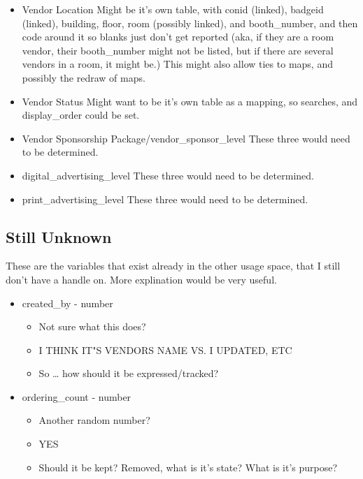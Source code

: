 \documentclass[captions=tablesignature]{scrartcl}
\begin{document}
\begin{itemize}
\item Vendor Location
\label{sec-2-5-5}
Might be it's own table, with conid (linked), badgeid (linked),
building, floor, room (possibly linked), and booth\_number, and
then code around it so blanks just don't get reported (aka, if
they are a room vendor, their booth\_number might not be listed,
but if there are several vendors in a room, it might be.)  This
might also allow ties to maps, and possibly the redraw of maps.

\item Vendor Status
\label{sec-2-5-6}
Might want to be it's own table as a mapping, so searches, and
display\_order could be set.

\item Vendor Sponsorship Package/vendor\_sponsor\_level
\label{sec-2-5-7}
These three would need to be determined.

\item digital\_advertising\_level
\label{sec-2-5-8}
These three would need to be determined.

\item print\_advertising\_level
\label{sec-2-5-9}
These three would need to be determined.
\end{itemize}

\subsection{Still Unknown}
\label{sec-2-6}
These are the variables that exist already in the other usage
space, that I still don't have a handle on.  More explination would
be very useful.
\begin{itemize}
\item created\_by - number
\label{sec-2-6-1}
\begin{itemize}
\item Not sure what this does?
\item I THINK IT"S VENDORS NAME VS. I UPDATED, ETC
\item So \ldots{} how should it be expressed/tracked?
\end{itemize}

\item ordering\_count - number
\label{sec-2-6-2}
\begin{itemize}
\item Another random number?
\item YES
\item Should it be kept?  Removed, what is it's state?  What is it's
purpose?
\end{itemize}
\end{itemize}
\end{document}
